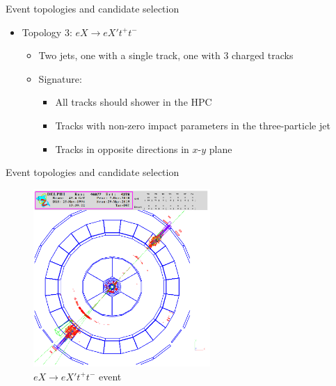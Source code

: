 \documentclass{beamer}
\begin{document}
\begin{frame}{Event topologies and candidate selection}
  \begin{itemize}
    \item{Topology $3$: $eX\to eX't^+t^-$}
    \begin{itemize}
      \item{Two jets, one with a single track, one with $3$ charged tracks}
      \item{Signature:}
      \begin{itemize}
        \item{All tracks should shower in the HPC}
        \item{Tracks with non-zero impact parameters in the three-particle jet}
        \item{Tracks in opposite directions in $x$-$y$ plane}
      \end{itemize}
    \end{itemize}
  \end{itemize}
\end{frame}

\begin{frame}{Event topologies and candidate selection}
  \begin{figure}
    \centering
    \includegraphics[width = 0.6\textwidth]{Topology3.png}
    \caption{$eX\to eX't^+t^-$ event}
  \end{figure}
\end{frame}
\end{document}
